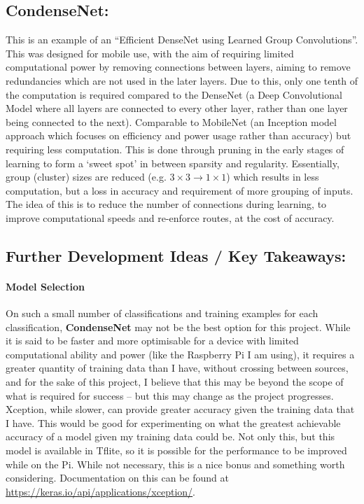 \subsection{CondenseNet:}
This is an example of an “Efficient DenseNet using Learned Group Convolutions”\cite{condensenet}. This was designed for mobile use, with the aim of
requiring limited computational power by removing connections between layers, aiming to remove redundancies which are not used in the
later layers. Due to this, only one tenth of the computation is required compared to the DenseNet (a Deep Convolutional Model where all
layers are connected to every other layer, rather than one layer being connected to the next). Comparable to MobileNet (an Inception
model approach which focuses on efficiency and power usage rather than accuracy) but requiring less computation.
This is done through pruning in the early stages of learning to form a ‘sweet spot’ \cite{condensenet} in between sparsity and
regularity. Essentially, group (cluster) sizes are reduced (e.g. $3 \times 3 \to 1 \times 1$) which results in less computation, but a
loss in accuracy and requirement of more grouping of inputs.
The idea of this is to reduce the number of connections during learning, to improve computational speeds and re-enforce routes, at the
cost of accuracy.

\subsection{Further Development Ideas / Key Takeaways:}
\paragraph{Model Selection}
On such a small number of classifications and training examples for each classification, \textbf{CondenseNet} may not be the best option for
this project. While it is said to be faster and more optimisable for a device with limited computational ability and power (like the
Raspberry Pi I am using), it requires a greater quantity of training data than I have, without crossing between sources, and for the
sake of this project, I believe that this may be beyond the scope of what is required for success – but this may change as the project
progresses.
Xception, while slower, can provide greater accuracy given the training data that I have. This would be good for experimenting on what
the greatest achievable accuracy of a model given my training data could be. Not only this, but this model is available in Tflite, so
it is possible for the performance to be improved while on the Pi. While not necessary, this is a nice bonus and something worth
considering.
Documentation on this can be found at \url{https://keras.io/api/applications/xception/}.

